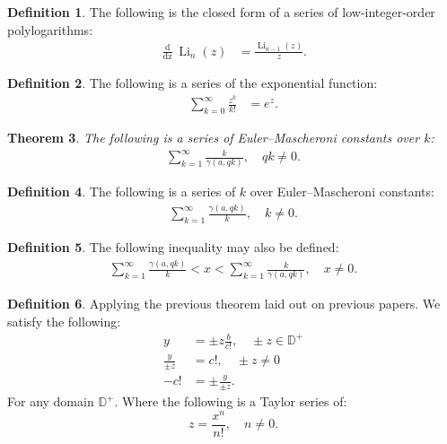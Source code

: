 \documentclass[10pt]{article}
\theoremstyle{plain}
\newtheorem{theorem}{Theorem}[section]
\theoremstyle{definition}
\newtheorem{definition}[theorem]{Definition}
\theoremstyle{remark}
\begin{document}
\begin{definition}
	The following is the closed form of a series of low-integer-order polylogarithms:
	\begin{align*}
		\frac{\operatorname{d}}{\operatorname{dz}} \operatorname{Li}_{n}(z) &= \frac{\operatorname{Li}_{n-1}(z)}{z}.
	\end{align*}
\end{definition}

\begin{definition}
	The following is a series of the exponential function:
	\begin{align*}
		\sum_{k=0}^{\infty} \frac{z^k}{k!} &= e^{z}.
	\end{align*}
\end{definition}

\begin{theorem}
	The following is a series of Euler–Mascheroni constants over $k$:
	\begin{align*}
		\sum_{k=1}^{\infty} \frac{k}{\gamma(a, qk)}, \quad qk \neq 0.
	\end{align*}
\end{theorem}

\begin{definition}
	The following is a series of $k$ over Euler–Mascheroni constants:
	\begin{align*}
		\sum_{k=1}^{\infty} \frac{\gamma(a, qk)}{k}, \quad k \neq 0.
	\end{align*}
\end{definition}

\begin{definition}
	The following inequality may also be defined:
	\begin{align*}
		\sum_{k=1}^{\infty} \frac{\gamma(a, qk)}{k} < x < \sum_{k=1}^{\infty} \frac{k}{\gamma(a, qk)}, \quad x \neq 0.
	\end{align*}
\end{definition}

\begin{definition}
	Applying the previous theorem laid out on previous papers. We satisfy the following:
	\begin{align*}
		y &= \pm z \frac{b}{c!}, \quad \pm z \in \mathbb{D}^{+}\\
		\frac{y}{\pm z} &= c!, \quad \pm z \neq 0\\
		-c! &= \pm \frac{y}{\pm z}.
	\end{align*}
	For any domain $\mathbb{D}^{+}$. Where the following is a Taylor series of:
	\begin{equation}
		z = \frac{x^n}{n!}, \quad n \neq 0.
	\end{equation}
\end{definition}
\end{document}
